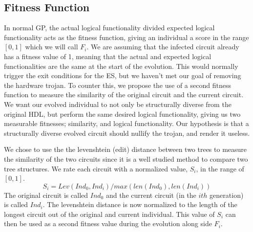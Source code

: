 \documentclass[conference]{IEEEtran}
\begin{document}
{\subsection{Fitness Function}
\label{net:fitness}
\par In normal GP, the actual logical functionality divided expected logical functionality acts as the fitness function, giving an individual a score in the range $[0,1]$ which we will call $F_i$.
We are assuming that the infected circuit already has a fitness value of 1, meaning that the actual and expected logical functionalities are the same at the start of the evolution.
This would normally trigger the exit conditions for the ES, but we haven't met our goal of removing the hardware trojan.
To counter this, we propose the use of a second fitness function to measure the similarity of the original circuit and the current circuit. 
We want our evolved individual to not only be structurally diverse from the original HDL, but perform the same desired logical functionality, giving us two measurable fitnesses; similarity, and logical functionality.
Our hypothesis is that a structurally diverse evolved circuit should nullify the trojan, and render it useless.

\par We chose to use the the levenshtein (edit) distance between two trees to measure the similarity of the two circuits since it is a well studied method to compare two tree structures\cite{xu2015algorithm,zhang1989simple,zhang1992editing}.
We rate each circuit with a normalized value, $S_i$, in the range of $[0,1]$.
\begin{equation}
    S_i = Lev(Ind_0,Ind_i) / max(len(Ind_0),len(Ind_i))
\end{equation}
The original circuit is called $Ind_0$ and the current circuit (in the $ith$ generation) is called $Ind_i$.
The levenshtein distance is now normalized to the length of the longest circuit out of the original and current individual.
This value of $S_i$ can then be used as a second fitness value during the evolution along side $F_i$.

}
\end{document}
